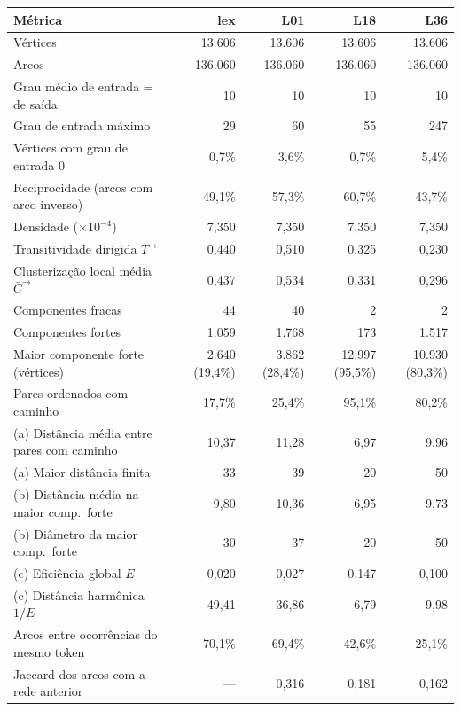 \begin{tabular}{lrrrr}
\toprule
Métrica & lex & L01 & L18 & L36 \\
\midrule
Vértices & 13.606 & 13.606 & 13.606 & 13.606 \\
Arcos & 136.060 & 136.060 & 136.060 & 136.060 \\
Grau médio de entrada = de saída & 10 & 10 & 10 & 10 \\
Grau de entrada máximo & 29 & 60 & 55 & 247 \\
Vértices com grau de entrada 0 & 0,7\% & 3,6\% & 0,7\% & 5,4\% \\
Reciprocidade (arcos com arco inverso) & 49,1\% & 57,3\% & 60,7\% & 43,7\% \\
Densidade ($\times 10^{-4}$) & 7,350 & 7,350 & 7,350 & 7,350 \\
Transitividade dirigida $T^{\rightarrow}$ & 0,440 & 0,510 & 0,325 & 0,230 \\
Clusterização local média $\bar C^{\rightarrow}$ & 0,437 & 0,534 & 0,331 & 0,296 \\
Componentes fracas & 44 & 40 & 2 & 2 \\
Componentes fortes & 1.059 & 1.768 & 173 & 1.517 \\
Maior componente forte (vértices) & 2.640 (19,4\%) & 3.862 (28,4\%) & 12.997 (95,5\%) & 10.930 (80,3\%) \\
Pares ordenados com caminho & 17,7\% & 25,4\% & 95,1\% & 80,2\% \\
(a) Distância média entre pares com caminho & 10,37 & 11,28 & 6,97 & 9,96 \\
(a) Maior distância finita & 33 & 39 & 20 & 50 \\
(b) Distância média na maior comp.\ forte & 9,80 & 10,36 & 6,95 & 9,73 \\
(b) Diâmetro da maior comp.\ forte & 30 & 37 & 20 & 50 \\
(c) Eficiência global $E$ & 0,020 & 0,027 & 0,147 & 0,100 \\
(c) Distância harmônica $1/E$ & 49,41 & 36,86 & 6,79 & 9,98 \\
\midrule
Arcos entre ocorrências do mesmo token & 70,1\% & 69,4\% & 42,6\% & 25,1\% \\
Jaccard dos arcos com a rede anterior & --- & 0,316 & 0,181 & 0,162 \\
\bottomrule
\end{tabular}
